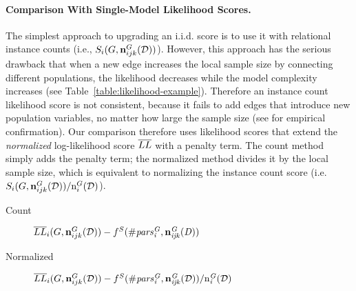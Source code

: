 \documentclass{article}
\begin{document}
\paragraph{Comparison With Single-Model Likelihood Scores.} 
The simplest approach to upgrading an i.i.d. score is to use it with relational instance counts (i.e., $S_{i}(G,\boldsymbol{\mathrm{n}}^{G}_{ijk}(\mathcal{D}))$). However, this approach has the serious drawback that when a new edge increases the local sample size by connecting different populations, the likelihood  decreases while the model complexity increases (see Table~\ref{table:likelihood-example}). Therefore an instance count likelihood score is not consistent, because it fails to add  edges that introduce new population variables, no matter how large the sample size (see \cite{Schulte2016a} for empirical confirmation). Our comparison therefore uses likelihood scores that extend the {\em normalized} log-likelihood score $\overline{LL}$ %
with a penalty term. The count method simply adds the penalty term; the normalized method divides it by the local sample size, which %
is equivalent to normalizing the instance count score (i.e. $S_{i}(G,\boldsymbol{\mathrm{n}}^{G}_{ijk}(\mathcal{D}))/\mathrm{n}^{G}_{i}(\mathcal{D})$).




\begin{description}
\item[Count]
{\small $\overline{LL}_{i}(G,\boldsymbol{\mathrm{n}}^{G}_{ijk}(\mathcal{D}))- f^{S}(\#\it{pars}_{i}^{G},\boldsymbol{\mathrm{n}}^{G}_{ijk}(D))$}
\item[Normalized] \small $\overline{LL}_{i}(G,\boldsymbol{\mathrm{n}}^{G}_{ijk}(\mathcal{D}))-f^{S}(\#\it{pars}_{i}^{G},\boldsymbol{\mathrm{n}}^{G}_{ijk}(\mathcal{D}))/\mathrm{n}^{G}_{i}(\mathcal{D})$
\end{description}
\end{document}

